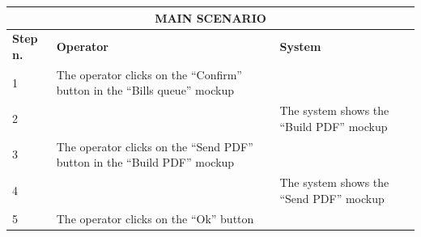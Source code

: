 {{{			\begin{table}[h]
			\begin{tabular}{|p{2cm}|p{6cm}|p{6cm}|}
			\hline
				\multicolumn{3}{|c|}{MAIN SCENARIO}\\
			\hline
				\centering \vspace{1mm} \bfseries{Step n.} \vspace{1mm} & \vspace{1mm} \bfseries{Operator} \vspace{1mm} & \vspace{1mm} \bfseries{System} \vspace{1mm}\\
			\hline
				\vspace{1mm} 1 \vspace{1mm} &
				\vspace{1mm} The operator clicks on the “Confirm” button in the “Bills queue” mockup \vspace{1mm} & 
				\vspace{1mm} \vspace{1mm} \\
			\hline
				\vspace{1mm} 2 \vspace{1mm} &
				\vspace{1mm} \vspace{1mm} & 
				\vspace{1mm} The system shows the “Build PDF” mockup \vspace{1mm} \\
			\hline
				\vspace{1mm} 3 \vspace{1mm} &
				\vspace{1mm} The operator clicks on the “Send PDF” button in the “Build PDF” mockup \vspace{1mm} & 
				\vspace{1mm} \vspace{1mm} \\
			\hline
				\vspace{1mm} 4 \vspace{1mm} &
				\vspace{1mm} \vspace{1mm} & 
				\vspace{1mm} The system shows the “Send PDF” mockup \vspace{1mm} \\
			\hline
				\vspace{1mm} 5 \vspace{1mm} &
				\vspace{1mm} The operator clicks on the “Ok” button \vspace{1mm} & 

\end{tabular}
\end{table}}}}
